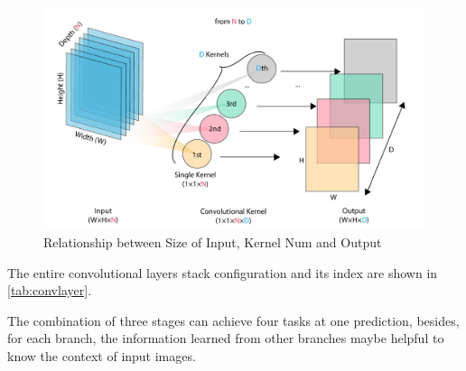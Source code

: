 \begin{spacing}{1.5}
\begin{figure}[ht]
\centering
\includegraphics[width=0.99\textwidth, fbox]{Chapter3/oneonekernel.pdf} %
\caption{Relationship between Size of Input, Kernel Num and Output}
\label{fig:oneonekernel} 
\end{figure}

The entire convolutional layers stack configuration and its index are shown in \autoref{tab:convlayer}.

\begin{table}[ht]
\centering
\caption{Convolutional Layers and Pooling Configuration}
\label{tab:convlayer}
\end{table}

The combination of three stages can achieve four tasks at one prediction, besides, for each branch, the information learned from other branches maybe helpful to know the context of input images.


\end{spacing}
